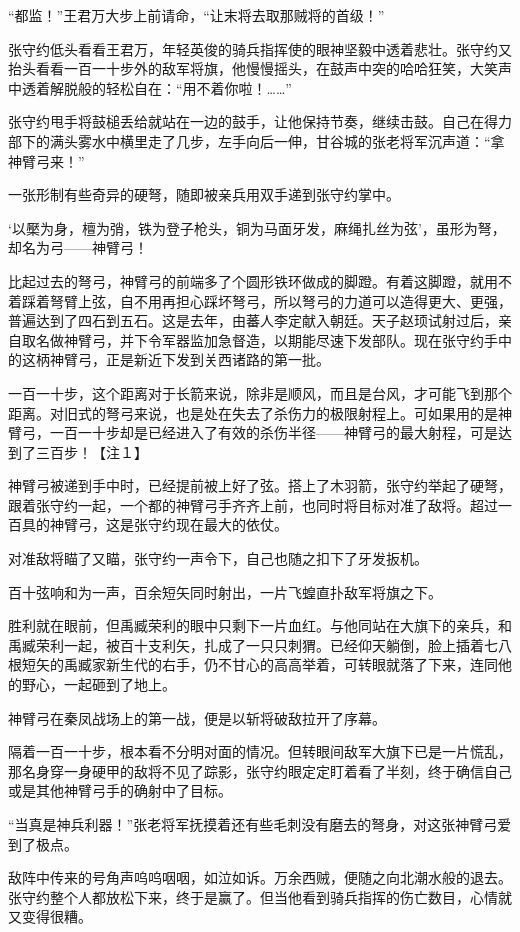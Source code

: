 “都监！”王君万大步上前请命，“让末将去取那贼将的首级！”

张守约低头看看王君万，年轻英俊的骑兵指挥使的眼神坚毅中透着悲壮。张守约又抬头看看一百一十步外的敌军将旗，他慢慢摇头，在鼓声中突的哈哈狂笑，大笑声中透着解脱般的轻松自在：“用不着你啦！……”

张守约甩手将鼓槌丢给就站在一边的鼓手，让他保持节奏，继续击鼓。自己在得力部下的满头雾水中横里走了几步，左手向后一伸，甘谷城的张老将军沉声道：“拿神臂弓来！”

一张形制有些奇异的硬弩，随即被亲兵用双手递到张守约掌中。

‘以檿为身，檀为弰，铁为登子枪头，铜为马面牙发，麻绳扎丝为弦’，虽形为弩，却名为弓——神臂弓！

比起过去的弩弓，神臂弓的前端多了个圆形铁环做成的脚蹬。有着这脚蹬，就用不着踩着弩臂上弦，自不用再担心踩坏弩弓，所以弩弓的力道可以造得更大、更强，普遍达到了四石到五石。这是去年，由蕃人李定献入朝廷。天子赵顼试射过后，亲自取名做神臂弓，并下令军器监加急督造，以期能尽速下发部队。现在张守约手中的这柄神臂弓，正是新近下发到关西诸路的第一批。

一百一十步，这个距离对于长箭来说，除非是顺风，而且是台风，才可能飞到那个距离。对旧式的弩弓来说，也是处在失去了杀伤力的极限射程上。可如果用的是神臂弓，一百一十步却是已经进入了有效的杀伤半径——神臂弓的最大射程，可是达到了三百步！【注１】

神臂弓被递到手中时，已经提前被上好了弦。搭上了木羽箭，张守约举起了硬弩，跟着张守约一起，一个都的神臂弓手齐齐上前，也同时将目标对准了敌将。超过一百具的神臂弓，这是张守约现在最大的依仗。

对准敌将瞄了又瞄，张守约一声令下，自己也随之扣下了牙发扳机。

百十弦响和为一声，百余短矢同时射出，一片飞蝗直扑敌军将旗之下。

胜利就在眼前，但禹臧荣利的眼中只剩下一片血红。与他同站在大旗下的亲兵，和禹臧荣利一起，被百十支利矢，扎成了一只只刺猬。已经仰天躺倒，脸上插着七八根短矢的禹臧家新生代的右手，仍不甘心的高高举着，可转眼就落了下来，连同他的野心，一起砸到了地上。

神臂弓在秦凤战场上的第一战，便是以斩将破敌拉开了序幕。

隔着一百一十步，根本看不分明对面的情况。但转眼间敌军大旗下已是一片慌乱，那名身穿一身硬甲的敌将不见了踪影，张守约眼定定盯着看了半刻，终于确信自己或是其他神臂弓手的确射中了目标。

“当真是神兵利器！”张老将军抚摸着还有些毛刺没有磨去的弩身，对这张神臂弓爱到了极点。

敌阵中传来的号角声呜呜咽咽，如泣如诉。万余西贼，便随之向北潮水般的退去。张守约整个人都放松下来，终于是赢了。但当他看到骑兵指挥的伤亡数目，心情就又变得很糟。

